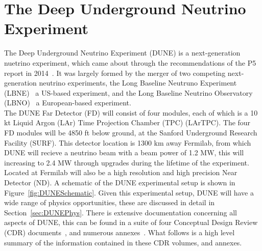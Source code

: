 \chapter{The Deep Underground Neutrino Experiment}  %

\graphicspath{{DUNE/Figs/PDF/}{DUNE/Figs/Raster/}{DUNE/Figs/Vector}}





The Deep Underground Neutrino Experiment (DUNE) is a next-generation nuetrino experiment, which came about through the recommendations of the P5 report in 2014~\citep{P5Doc}. It was largely formed by the merger of two competing next-generation neutrino experiments, the Long Baseline Neutruno Experiment (LBNE)~\citep{LBNE_CDR1, LBNE_CDR2, LBNE_CDR3, LBNE_CDR4, LBNE_CDR5, LBNE_CDR6} a US-based experiment, and the Long Baseline Neutrino Observatory (LBNO)~\citep{LBNO_EOI} a European-based experiment. \\

The DUNE Far Detector (FD) will consist of four modules, each of which is a 10 kt Liquid Argon (LAr) Time Projection Chamber (TPC) (LArTPC). The four FD modules will be 4850 ft below ground, at the Sanford Underground Research Facility (SURF). This detector location is 1300 km away Fermilab, from which DUNE will recieve a neutrino beam with a beam power of 1.2 MW, this will increasing to 2.4 MW through upgrades during the lifetime of the experiment. Located at Fermilab will also be a high resolution and high precision Near Detector (ND). A schematic of the DUNE experimental setup is shown in Figure~\ref{fig:DUNESchematic}. Given this experimental setup, DUNE will have a wide range of physics opportunities, these are discussed in detail in Section~\ref{sec:DUNEPhys}. There is extensive documentation concerning all aspects of DUNE, this can be found in a suite of four Conceptual Design Review (CDR) documents~\citep{DUNECDR_V1, DUNECDR_V2, DUNECDR_V3, DUNECDR_V4}, and numerous annexes~\citep{DUNEAtWork}. What follows is a high level summary of the information contained in these CDR volumes, and annexes. \\ 

